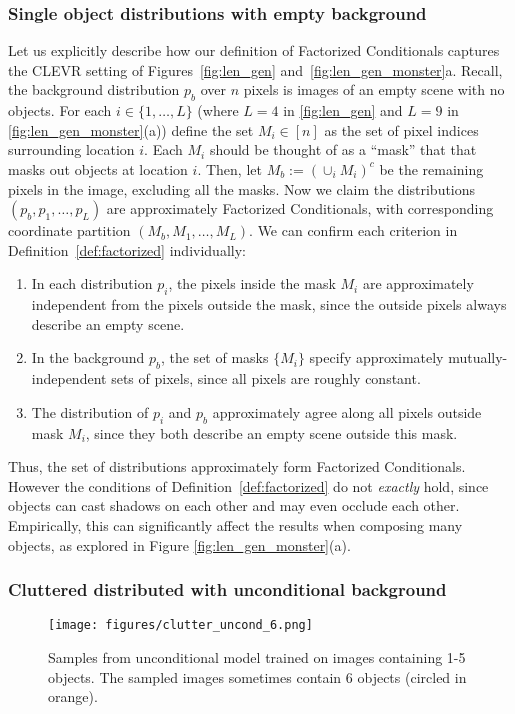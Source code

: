 \subsubsection{Single object distributions with empty background}
Let us explicitly describe how
our definition of Factorized Conditionals
captures the CLEVR setting of Figures~\ref{fig:len_gen} and~\ref{fig:len_gen_monster}a.
Recall, the background distribution $p_b$ 
over $n$ pixels is images of an empty scene with no objects.
For each $i \in \{1,\ldots,L\}$ (where $L = 4$ in \cref{fig:len_gen} and $L=9$ in \cref{fig:len_gen_monster}(a)) define the set $M_i \in [n]$ 
as the set of pixel indices surrounding location $i$.
Each $M_i$ should be thought of as a ``mask'' that
that masks out objects at location $i$.
Then, let $M_b := (\cup_i M_i)^c$ be the remaining
pixels in the image, excluding all the masks.
Now we claim the distributions $(p_b, p_1, \ldots, p_L)$
are approximately Factorized Conditionals, with corresponding
coordinate partition $(M_b, M_1, \ldots, M_L)$.
We can confirm each criterion in Definition~\ref{def:factorized}
individually:
\begin{enumerate}
    \setlength{\itemsep}{1pt}
    \item In each distribution $p_i$, the pixels inside the
    mask $M_i$ are approximately independent from the pixels outside the mask,
    since the outside pixels always describe an empty scene.
    \item In the background $p_b$,
    the set of masks $\{M_i\}$ specify approximately
    mutually-independent sets of pixels,
    since all pixels are roughly constant.
    \item The distribution of $p_i$ and $p_b$ approximately agree 
    along all pixels outside mask $M_i$, since they both
    describe an empty scene outside this mask.
\end{enumerate}
Thus, the set of distributions approximately form
Factorized Conditionals. However the conditions of Definition~\ref{def:factorized} do not \emph{exactly} hold, since objects can cast shadows on each other and may even occlude each other. Empirically, this can significantly affect the results when composing many objects, as explored in Figure \ref{fig:len_gen_monster}(a).

\subsubsection{Cluttered distributed with unconditional background}
\begin{figure}[hb]
\vskip 0.2in
\begin{center}
\centerline{
\texttt{[image: figures/clutter\_uncond\_6.png]}
}
\caption{Samples from unconditional model trained on images containing 1-5 objects. The sampled images sometimes contain 6 objects (circled in orange).}
\label{fig:clutter_uncond_6}
\end{center}
\vskip -0.2in
\end{figure}

